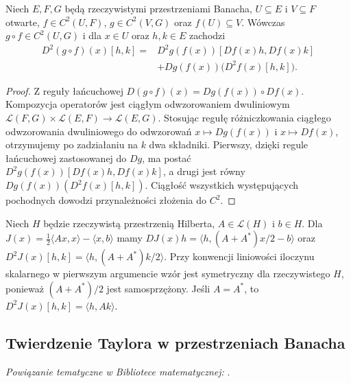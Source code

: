 \begin{stwierdzenie}
\label{prop:second-chain15}
Niech $E,F,G$ będą rzeczywistymi przestrzeniami Banacha, $U\subseteq E$ i $V\subseteq F$ otwarte, $f\in C^2(U,F)$, $g\in C^2(V,G)$ oraz $f(U)\subseteq V$. Wówczas $g\circ f\in C^2(U,G)$ i dla $x\in U$ oraz $h,k\in E$ zachodzi
\[
\begin{aligned}
D^2(g\circ f)(x)[h,k]
={}&D^2g(f(x))[Df(x)h,Df(x)k]\\
 &+Dg(f(x))\bigl(D^2f(x)[h,k]\bigr).
\end{aligned}
\]
\end{stwierdzenie}
\begin{proof}
Z reguły łańcuchowej $D(g\circ f)(x)=Dg(f(x))\circ Df(x)$. Kompozycja operatorów jest ciągłym odwzorowaniem dwuliniowym $\mathcal L(F,G)\times\mathcal L(E,F)\to\mathcal L(E,G)$. Stosując regułę różniczkowania ciągłego odwzorowania dwuliniowego do odwzorowań $x\mapsto Dg(f(x))$ i $x\mapsto Df(x)$, otrzymujemy po zadziałaniu na $k$ dwa składniki. Pierwszy, dzięki regule łańcuchowej zastosowanej do $Dg$, ma postać $D^2g(f(x))[Df(x)h,Df(x)k]$, a drugi jest równy $Dg(f(x))(D^2f(x)[h,k])$. Ciągłość wszystkich występujących pochodnych dowodzi przynależności złożenia do $C^2$.
\end{proof}

\begin{przyklad}
\label{ex:hessian15}
Niech $H$ będzie rzeczywistą przestrzenią Hilberta, $A\in\mathcal L(H)$ i $b\in H$. Dla $J(x)=\frac12\langle Ax,x\rangle-\langle x,b\rangle$ mamy
$DJ(x)h=\langle h,(A+A^*)x/2-b\rangle$ oraz
$D^2J(x)[h,k]=\langle h,(A+A^*)k/2\rangle$.
Przy konwencji liniowości iloczynu skalarnego w pierwszym argumencie wzór jest symetryczny dla rzeczywistego $H$, ponieważ $(A+A^*)/2$ jest samosprzężony. Jeśli $A=A^*$, to $D^2J(x)[h,k]=\langle h,Ak\rangle$.
\end{przyklad}

\subsection{Twierdzenie Taylora w przestrzeniach Banacha}

\noindent\emph{Powiązanie tematyczne w Bibliotece matematycznej:} .


